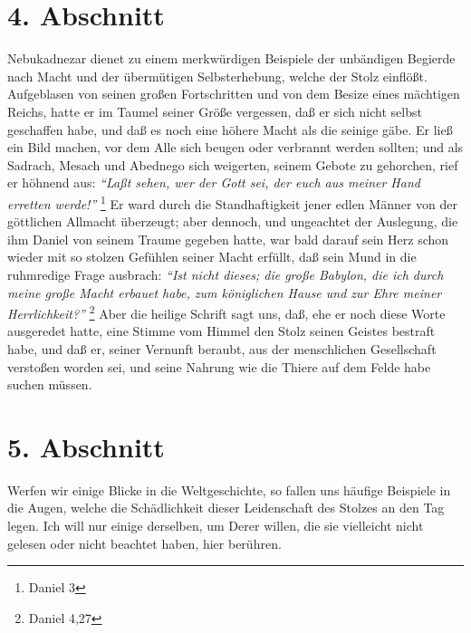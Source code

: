 \section{4. Abschnitt} \label{kap8_ab4}

Nebukadnezar dienet zu einem merkwürdigen Beispiele der unbändigen Begierde nach
Macht und der übermütigen Selbsterhebung, welche der Stolz einflößt. Aufgeblasen
von seinen großen Fortschritten und von dem Besize eines mächtigen Reichs, hatte
er im Taumel seiner Größe vergessen, daß er sich nicht selbst geschaffen habe,
und daß es noch eine höhere Macht als die seinige gäbe. Er ließ ein Bild machen,
vor dem Alle sich beugen oder verbrannt werden sollten; und als Sadrach, Mesach
und Abednego sich weigerten, seinem Gebote zu gehorchen, rief er höhnend aus:
\textit{"`Laßt sehen, wer der Gott sei, der euch aus meiner Hand erretten
werde!"'}
\footnote{Daniel 3}
Er ward durch die Standhaftigkeit jener edlen Männer
von der göttlichen Allmacht überzeugt; aber dennoch, und ungeachtet der
Auslegung, die ihm Daniel von seinem Traume gegeben hatte, war bald darauf sein
Herz schon wieder mit so stolzen Gefühlen seiner Macht erfüllt, daß sein Mund in
die ruhmredige Frage ausbrach:
\textit{"`Ist nicht dieses; die große Babylon, die ich
durch meine große Macht erbauet habe, zum königlichen Hause und zur Ehre meiner
Herrlichkeit?"'}
\footnote{Daniel 4,27}
Aber die heilige Schrift sagt uns, daß, ehe
er noch diese Worte ausgeredet hatte, eine Stimme vom Himmel den Stolz seinen
Geistes bestraft habe, und daß er, seiner Vernunft beraubt, aus der menschlichen
Gesellschaft verstoßen worden sei, und seine Nahrung wie die Thiere auf dem
Felde habe suchen müssen.

\section{5. Abschnitt} \label{kap8_ab5}

Werfen wir einige Blicke in die Weltgeschichte, so fallen uns häufige Beispiele
in die Augen, welche die Schädlichkeit dieser Leidenschaft des Stolzes an den
Tag legen. Ich will nur einige derselben, um Derer willen, die sie vielleicht
nicht gelesen oder nicht beachtet haben, hier berühren.

\medskip

